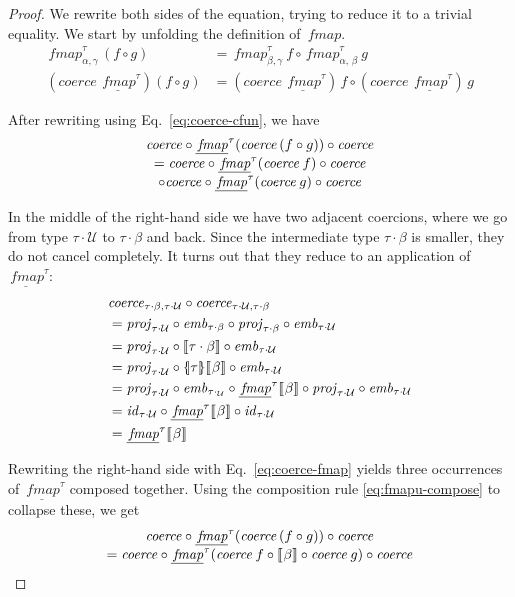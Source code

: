 \documentclass{sigplanconf}
\newcommand{\U}{\ensuremath{\mathcal{U}}}
\newcommand{\univ}[1]{\ensuremath{\underline{#1}}}
\newcommand{\REP}[1]{\ensuremath{\llbracket#1\rrbracket}}
\newcommand{\symlbrace}{\mathopen{\lbrace\mkern-4.5mu\mid}}
\newcommand{\symrbrace}{\mathclose{\mid\mkern-4.5mu\rbrace}}
\newcommand{\TC}[1]{\ensuremath{\symlbrace#1\symrbrace}}
\newcommand{\hair}{\mskip1mu}
\newcommand{\hsc}[1]{\ensuremath{\mathit{#1}}}
\newcommand{\hsid}{\hsc{id}}
\newcommand{\hsemb}{\hsc{emb}}
\newcommand{\hsprj}{\hsc{proj}}
\newcommand{\hscoerce}{\hsc{coerce}}
\newcommand{\fmap}{\,\hsc{fmap}} %
\newcommand{\fmapU}{\univ{\fmap}}
\newcommand{\tA}{\alpha}
\newcommand{\tB}{\beta}
\newcommand{\tC}{\gamma}
\newcommand{\tT}{\tau}
\theoremstyle{definition}
\begin{document}
\begin{proof}
We rewrite both sides of the equation, trying to reduce it to a trivial equality. We start by unfolding the definition of $\fmap$.
%
\begin{align*}
\fmap^\tT_{\tA,\tC}\,(f \circ g) &= \fmap^\tT_{\tB,\tC}\:f \circ \fmap^\tT_{\tA,\,\tB}\:g \\
(\hscoerce\:\fmapU^\tT)(f \circ g) &= (\hscoerce\:\fmapU^\tT)\,f \circ (\hscoerce\:\fmapU^\tT)\,g
\end{align*}

\noindent
After rewriting using Eq.~\eqref{eq:coerce-cfun}, we have
%
\begin{multline*}
\hscoerce \circ \fmapU^\tT(\hscoerce\,(f \circ g)) \circ \hscoerce \\[-\jot]
= \hscoerce \circ \fmapU^\tT(\hscoerce\:f) \circ \hscoerce \\[-\jot]
\circ \hscoerce \circ \fmapU^\tT(\hscoerce\:g) \circ \hscoerce
\end{multline*}

In the middle of the right-hand side we have two adjacent coercions, where we go from type $\tT\cdot\U$ to $\tT\cdot\tB$ and back. Since the intermediate type $\tT\cdot\tB$ is smaller, they do not cancel completely. It turns out that they reduce to an application of $\fmapU^\tT$:
%
\begin{align}
\notag & \hscoerce_{\tT\cdot\tB,\tT\cdot\U} \circ \hscoerce_{\tT\cdot\U,\tT\cdot\tB} \\
\notag & = \hsprj_{\tT\cdot\U} \circ \hsemb_{\tT\cdot\tB} \circ \hsprj_{\tT\cdot\tB} \circ \hsemb_{\tT\cdot\U} \\
\notag & = \hsprj_{\tT\cdot\U} \circ \REP{\tT\cdot\tB} \circ \hsemb_{\tT\cdot\U} \\
\notag & = \hsprj_{\tT\cdot\U} \circ \TC{\tT}\REP{\hair\tB} \circ \hsemb_{\tT\cdot\U} \\
\notag & = \hsprj_{\tT\cdot\U} \circ \hsemb_{\tT\cdot_\U} \circ \fmapU^\tT\REP{\hair\tB} \circ \hsprj_{\tT\cdot\U} \circ \hsemb_{\tT\cdot\U} \\
\notag & = \hsid_{\tT\cdot\U} \circ \fmapU^\tT\REP{\hair\tB} \circ \hsid_{\tT\cdot\U} \\
\label{eq:coerce-fmap} & = \fmapU^\tT\REP{\hair\tB}
\end{align}

Rewriting the right-hand side with Eq.~\eqref{eq:coerce-fmap} yields three occurrences of $\fmapU^\tT$ composed together. Using the composition rule \eqref{eq:fmapu-compose} to collapse these, we get
%
\begin{multline*}
\hscoerce \circ \fmapU^\tT(\hscoerce\,(f \circ g)) \circ \hscoerce \\[-\jot]
= \hscoerce \circ \fmapU^\tT(\hscoerce\:f \circ \REP{\hair\tB} \circ \hscoerce\:g) \circ \hscoerce
\end{multline*}


\end{proof}
\end{document}
